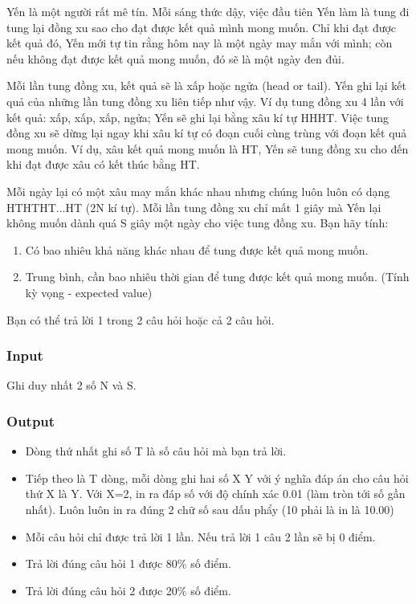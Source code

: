 

Yến là một người rất mê tín. Mỗi sáng thức dậy, việc đầu tiên Yến làm là tung đi tung lại đồng xu sao cho đạt được kết quả mình mong muốn. Chỉ khi đạt được kết quả đó, Yến mới tự tin rằng hôm nay là một ngày may mắn với mình; còn nếu không đạt được kết quả mong muốn, đó sẽ là một ngày đen đủi.

Mỗi lần tung đồng xu, kết quả sẽ là xấp hoặc ngửa (head or tail). Yến ghi lại kết quả của những lần tung đồng xu liên tiếp như vậy. Ví dụ tung đồng xu 4 lần với kết quả: xấp, xấp, xấp, ngửa; Yến sẽ ghi lại bằng xâu kí tự HHHT. Việc tung đồng xu sẽ dừng lại ngay khi xâu kí tự có đoạn cuối cùng trùng với đoạn kết quả mong muốn. Ví dụ, xâu kết quả mong muốn là HT, Yến sẽ tung đồng xu cho đến khi đạt được xâu có kết thúc bằng HT.

Mỗi ngày lại có một xâu may mắn khác nhau nhưng chúng luôn luôn có dạng HTHTHT...HT (2N kí tự). Mỗi lần tung đồng xu chỉ mất 1 giây mà Yến lại không muốn dành quá S giây một ngày cho việc tung đồng xu. Bạn hãy tính:
\begin{enumerate}
	\item Có bao nhiêu khả năng khác nhau để tung được kết quả mong muốn.
	\item Trung bình, cần bao nhiêu thời gian để tung được kết quả mong muốn. (Tính kỳ vọng - expected value)
\end{enumerate}

Bạn có thể trả lời 1 trong 2 câu hỏi hoặc cả 2 câu hỏi.

\subsubsection{Input}

Ghi duy nhất 2 số N và S.

\subsubsection{Output}
\begin{itemize}
	\item Dòng thứ nhất ghi số T là số câu hỏi mà bạn trả lời.
	\item Tiếp theo là T dòng, mỗi dòng ghi hai số X Y với ý nghĩa đáp án cho câu hỏi thứ X là Y. Với X=2, in ra đáp số với độ chính xác 0.01 (làm tròn tới số gần nhất). Luôn luôn in ra đúng 2 chữ số sau dấu phẩy (10 phải là in là 10.00)
	\item Mỗi câu hỏi chỉ được trả lời 1 lần. Nếu trả lời 1 câu 2 lần sẽ bị 0 điểm.
	\item Trả lời đúng câu hỏi 1 được 80\% số điểm.
	\item Trả lời đúng câu hỏi 2 được 20\% số điểm.
\end{itemize}

